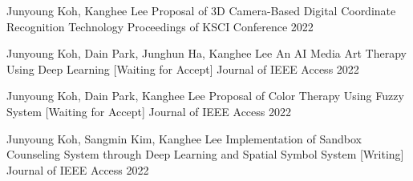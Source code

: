 
 \begin{cventries}

  \cventry
    {Junyoung Koh, Kanghee Lee} %
    {Proposal of 3D Camera-Based Digital Coordinate Recognition Technology} %
    {Proceedings of KSCI Conference} %
    {2022} %
    {
      \begin{cvitems} %
      \end{cvitems}
    }
\end{cventries}
\begin{cventries}

  \cventry
    {Junyoung Koh, Dain Park, Junghun Ha, Kanghee Lee} %
    {An AI Media Art Therapy Using Deep Learning [Waiting for Accept]} %
    {Journal of IEEE Access} %
    {2022} %
    {
      \begin{cvitems} %
      \end{cvitems}
    }

  \cventry
    {Junyoung Koh, Dain Park, Kanghee Lee} %
    {Proposal of Color Therapy Using Fuzzy System [Waiting for Accept]} %
    {Journal of IEEE Access} %
    {2022} %
    {
      \begin{cvitems} %
      \end{cvitems}
    } 
    
    
  \cventry
    {Junyoung Koh, Sangmin Kim, Kanghee Lee} %
    {Implementation of Sandbox Counseling System through Deep Learning and Spatial Symbol System [Writing]} %
    {Journal of IEEE Access} %
    {2022} %
    {
      \begin{cvitems} %
      \end{cvitems}
    }    
\end{cventries}
